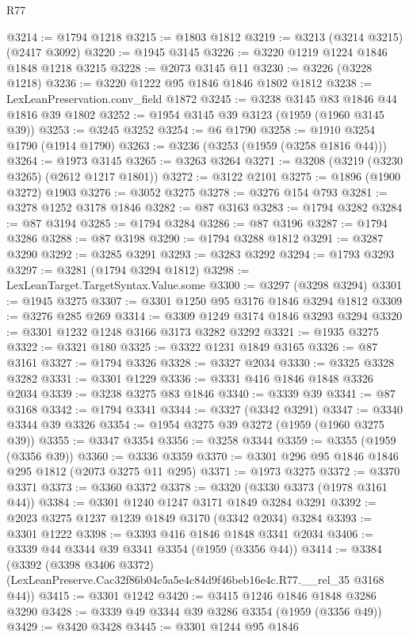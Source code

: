 \begin{lexlean}{R77}
\begin{coremodule}
@3214 := @1794 @1218
@3215 := @1803 @1812
@3219 := @3213 (@3214 @3215) (@2417 @3092)
@3220 := @1945 @3145
@3226 := @3220 @1219 @1224 @1846 @1848 @1218 @3215
@3228 := @2073 @3145 @11
@3230 := @3226 (@3228 @1218)
@3236 := @3220 @1222 @95 @1846 @1846 @1802 @1812
@3238 := LexLeanPreservation.conv_field @1872
@3245 := @3238 @3145 @83 @1846 @44 @1816 @39 @1802
@3252 := @1954 @3145 @39 @3123 (@1959 (@1960 @3145 @39))
@3253 := @3245 @3252
@3254 := @6 @1790
@3258 := @1910 @3254 @1790 (@1914 @1790)
@3263 := @3236 (@3253 (@1959 (@3258 @1816 @44)))
@3264 := @1973 @3145
@3265 := @3263 @3264
@3271 := @3208 (@3219 (@3230 @3265) (@2612 @1217 @1801))
@3272 := @3122 @2101
@3275 := @1896 (@1900 @3272) @1903
@3276 := @3052 @3275
@3278 := @3276 @154 @793
@3281 := @3278 @1252 @3178 @1846
@3282 := @87 @3163
@3283 := @1794 @3282
@3284 := @87 @3194
@3285 := @1794 @3284
@3286 := @87 @3196
@3287 := @1794 @3286
@3288 := @87 @3198
@3290 := @1794 @3288 @1812
@3291 := @3287 @3290
@3292 := @3285 @3291
@3293 := @3283 @3292
@3294 := @1793 @3293
@3297 := @3281 (@1794 @3294 @1812)
@3298 := LexLeanTarget.TargetSyntax.Value.some
@3300 := @3297 (@3298 @3294)
@3301 := @1945 @3275
@3307 := @3301 @1250 @95 @3176 @1846 @3294 @1812
@3309 := @3276 @285 @269
@3314 := @3309 @1249 @3174 @1846 @3293 @3294
@3320 := @3301 @1232 @1248 @3166 @3173 @3282 @3292
@3321 := @1935 @3275
@3322 := @3321 @180
@3325 := @3322 @1231 @1849 @3165
@3326 := @87 @3161
@3327 := @1794 @3326
@3328 := @3327 @2034
@3330 := @3325 @3328 @3282
@3331 := @3301 @1229
@3336 := @3331 @416 @1846 @1848 @3326 @2034
@3339 := @3238 @3275 @83 @1846
@3340 := @3339 @39
@3341 := @87 @3168
@3342 := @1794 @3341
@3344 := @3327 (@3342 @3291)
@3347 := @3340 @3344 @39 @3326
@3354 := @1954 @3275 @39 @3272 (@1959 (@1960 @3275 @39))
@3355 := @3347 @3354
@3356 := @3258 @3344
@3359 := @3355 (@1959 (@3356 @39))
@3360 := @3336 @3359
@3370 := @3301 @296 @95 @1846 @1846 @295 @1812 (@2073 @3275 @11 @295)
@3371 := @1973 @3275
@3372 := @3370 @3371
@3373 := @3360 @3372
@3378 := @3320 (@3330 @3373 (@1978 @3161 @44))
@3384 := @3301 @1240 @1247 @3171 @1849 @3284 @3291
@3392 := @2023 @3275 @1237 @1239 @1849 @3170 (@3342 @2034) @3284
@3393 := @3301 @1222
@3398 := @3393 @416 @1846 @1848 @3341 @2034
@3406 := @3339 @44 @3344 @39 @3341 @3354 (@1959 (@3356 @44))
@3414 := @3384
    (@3392
      (@3398 @3406 @3372)
      (LexLeanPreserve.Cac32f86b04c5a5e4c84d9f46beb16e4c.R77.__rel_35 @3168 @44))
@3415 := @3301 @1242
@3420 := @3415 @1246 @1846 @1848 @3286 @3290
@3428 := @3339 @49 @3344 @39 @3286 @3354 (@1959 (@3356 @49))
@3429 := @3420 @3428
@3445 := @3301
    @1244
    @95
    @1846

\end{coremodule}
\end{lexlean}
